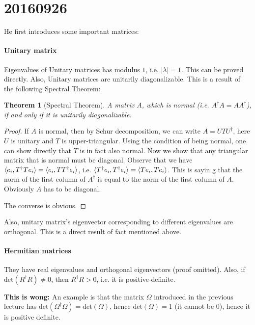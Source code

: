\documentclass{article}
\numberwithin{equation}{subsection} %
\newtheorem{thm}{Theorem}[section]
\theoremstyle{definition}
\begin{document}
\section{20160926}
\label{sec:20160926}

He first introduces some important matrices:

\paragraph{Unitary matrix} Eigenvalues of Unitary matrices has modulus $1$,
i.e. $|\lambda|=1$. This can be proved directly. Also, Unitary matrices are unitarily diagonalizable. This is a result of the following Spectral Theorem:
\begin{thm}[Spectral Theorem]
    A matrix $A$, which is normal (i.e. $A^\dagger A= AA^\dagger$), if and only if it is unitarily diagonalizable.
\end{thm}
\begin{proof}
    If $A$ is normal, then by Schur decomposition, we can write
    $A=UTU^\dagger$, here $U$ is unitary and $T$ is upper-triangular. 
    Using the condition of being normal, one can show directly that $T$ 
    is in fact also normal. Now we show that any triangular matrix that 
    is normal must be diagonal. Observe that we have 
    $\braket{e_i,T^\dagger T e_i}=\braket{e_i,TT^\dagger e_i}$, 
    i.e. $\braket{T^\dagger e_i, T^\dagger e_i}=\braket{T e_i, T e_i}$. 
    This is sayin g that the norm of the first column of $A^\dagger$ 
    is equal to the norm of the first column of $A$. Obviously 
    $A$ has to be diagonal.

    The converse is obvious.
\end{proof}

Also, unitary matrix's eigenvector corresponding to different eigenvalues 
are orthogonal. This is a direct result of fact mentioned above.

\paragraph{Hermitian matrices} They have real eigenvalues and orthogonal
eigenvectors (proof omitted). Also, if $\text{det}(R^\dagger R)\neq 0$,
then $R^\dagger R >0$, i.e. it is positive-definite. 

\textbf{This is wong:} An example is that
the matrix $\Omega$ introduced in the previous lecture has
$\text{det}(\Omega^\dagger \Omega)=\text{det}(\Omega)$, hence
$\text{det}(\Omega)=1$ (it cannot be $0$), hence it is positive definite.
\end{document}
